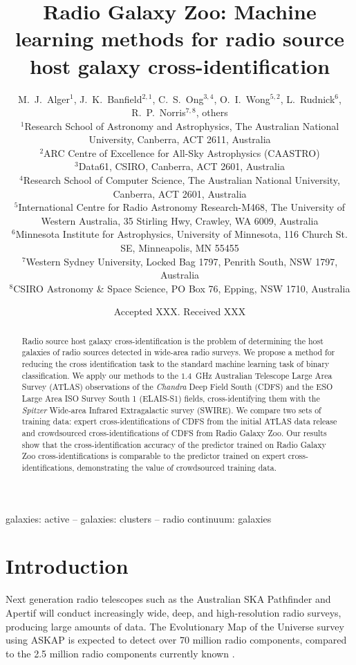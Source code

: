 \documentclass[fleqn,usenatbib,usedcolumn]{mnras}
\title[Machine learning methods for radio source cross-identification]{Radio Galaxy Zoo: Machine learning methods for radio source host galaxy cross-identification}
\author[Alger et al.]{
  M.~J.~Alger$^{1}$,
  J.~K.~Banfield$^{2, 1}$,
  C.~S.~Ong$^{3, 4}$,
  O.~I.~Wong$^{5, 2}$,
  L.~Rudnick$^{6}$,
  R.~P.~Norris$^{7, 8}$, others
\\
$^{1}$Research School of Astronomy and Astrophysics, The Australian National University, Canberra, ACT 2611, Australia\\
$^{2}$ARC Centre of Excellence for All-Sky Astrophysics (CAASTRO)\\
$^{3}$Data61, CSIRO, Canberra, ACT 2601, Australia\\
$^{4}$Research School of Computer Science, The Australian National University, Canberra, ACT 2601, Australia\\
$^{5}$International Centre for Radio Astronomy Research-M468, The University of Western Australia, 35 Stirling Hwy, Crawley, WA 6009, Australia\\
$^{6}$Minnesota Institute for Astrophysics, University of Minnesota, 116 Church St. SE, Minneapolis, MN 55455\\
$^{7}$Western Sydney University, Locked Bag 1797, Penrith South, NSW 1797, Australia\\
$^{8}$CSIRO Astronomy \& Space Science, PO Box 76, Epping, NSW 1710, Australia
}
\date{Accepted XXX. Received XXX}
\begin{document}
\label{firstpage}
\pagerange{\pageref{firstpage}--\pageref{lastpage}}
\maketitle

\begin{abstract}
  Radio source host galaxy cross-identification is the problem of determining
  the host galaxies of radio sources detected in wide-area radio surveys. We
  propose a method for reducing the cross identification task to the standard
  machine learning task of binary classification. We apply our methods to the
  $1.4$~GHz Australian Telescope Large Area Survey (ATLAS) observations of the
  \emph{Chandra} Deep Field South (CDFS) and the ESO Large Area ISO Survey
  South 1 (ELAIS-S1) fields, cross-identifying them with the \emph{Spitzer}
  Wide-area Infrared Extragalactic survey (SWIRE). We compare two sets of
  training data: expert cross-identifications of CDFS from the initial ATLAS
  data release and crowdsourced cross-identifications of CDFS from Radio
  Galaxy Zoo. Our results show that the cross-identification accuracy of the
  predictor trained on Radio Galaxy Zoo cross-identifications is comparable to
  the predictor trained on expert cross-identifications, demonstrating the
  value of crowdsourced training data.
\end{abstract}

\begin{keywords}
galaxies: active -- galaxies: clusters -- radio continuum: galaxies
\end{keywords}


\section{Introduction}\label{introduction}

  Next generation radio telescopes such as the Australian SKA Pathfinder
  \citep[ASKAP;][]{johnston07} and Apertif \citep{verheijen08} will conduct
  increasingly wide, deep, and high-resolution radio surveys, producing large
  amounts of data. The Evolutionary Map of the Universe survey
  \citep[EMU;][]{norris11} using ASKAP is expected to detect over 70 million
  radio components, compared to the 2.5 million radio components currently
  known \citep{banfield15}.
\end{document}
